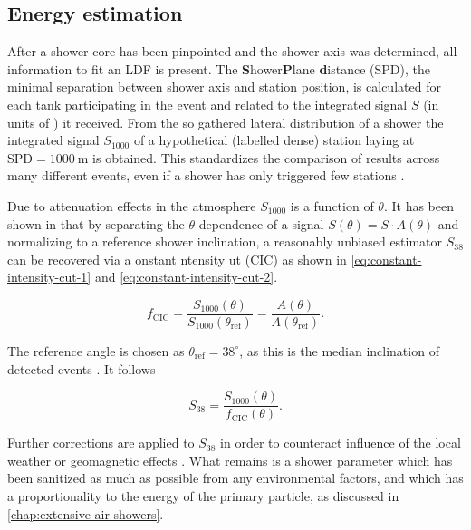 \subsection{Energy estimation}
\label{ssec:energy-estimation}

After a shower core has been pinpointed and the shower axis was determined, all information to fit an LDF is present. The \textbf{S}hower\textbf{P}lane 
\textbf{d}istance (SPD), the minimal separation between shower axis and station position, is calculated for each tank participating in the event and related to the
integrated signal $S$ (in units of \Qpeak) it received. From the so gathered lateral distribution of a shower the integrated signal $S_{1000}$ of a hypothetical 
(labelled dense) station laying at $\text{SPD} = \SI{1000}{\meter}$ is obtained.
This standardizes the comparison of results across many different events, even if a shower has only triggered few stations \cite{gaisser1977reliability}.

Due to attenuation effects in the atmosphere $S_{1000}$ is a function of $\theta$. It has been shown in \cite{DarkoCIC} that by separating the $\theta$ dependence
of a signal $S(\theta) = S\cdot A(\theta)$ and normalizing to a reference shower inclination, a reasonably unbiased estimator $S_{38}$ can be recovered via a 
onstant ntensity ut (CIC) as shown in \autoref{eq:constant-intensity-cut-1} and \autoref{eq:constant-intensity-cut-2}.

\begin{equation}
\label{eq:constant-intensity-cut-1}
f_\text{CIC} = \frac{S_{1000}(\theta)}{S_{1000}(\theta_\text{ref})}=\frac{A(\theta)}{A(\theta_\text{ref})}.
\end{equation}

The reference angle is chosen as $\theta_\text{ref} = 38^\circ$, as this is the median inclination of detected events \cite{aab2020measurement}. It follows

\begin{equation}
\label{eq:constant-intensity-cut-2}
S_{38} = \frac{S_{1000}(\theta)}{f_\text{CIC}(\theta)}.
\end{equation}

Further corrections are applied to $S_{38}$ in order to counteract influence of the local weather or geomagnetic effects \cite{aab2020measurement}. What remains is a shower 
parameter which has been sanitized as much as possible from any environmental factors, and which has a proportionality to the energy of the primary particle, 
as discussed in \autoref{chap:extensive-air-showers}.

